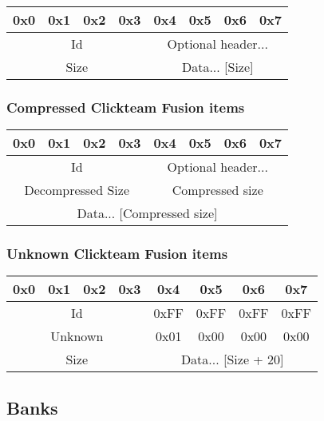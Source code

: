 \documentclass{article}
\begin{document}
\begin{tabular}{c|c|c|c|c|c|c|c}
  0x0 & 0x1 & 0x2 & 0x3 & 0x4 & 0x5 & 0x6 & 0x7
  \\ \hline
  \multicolumn{4}{|c|}{Id} &
  \multicolumn{4}{|c}{Optional header...}
  \\ \hline \hline
  \multicolumn{4}{|c|}{Size} &
  \multicolumn{4}{|c}{Data... [Size]}
  \\ \hline
\end{tabular}

\subsubsection[Compressed CTF items]{Compressed Clickteam Fusion items}

\begin{tabular}{c|c|c|c|c|c|c|c}
  0x0 & 0x1 & 0x2 & 0x3 & 0x4 & 0x5 & 0x6 & 0x7
  \\ \hline
  \multicolumn{4}{|c|}{Id} &
  \multicolumn{4}{|c}{Optional header...}
  \\ \hline \hline
  \multicolumn{4}{|c|}{Decompressed Size} &
  \multicolumn{4}{|c|}{Compressed size}
  \\ \hline
  \multicolumn{8}{|c}{Data... [Compressed size]}
  \\ \hline
\end{tabular}

\subsubsection[Unknown CTF items]{Unknown Clickteam Fusion items}

\begin{tabular}{c|c|c|c|c|c|c|c}
  0x0 & 0x1 & 0x2 & 0x3 & 0x4 & 0x5 & 0x6 & 0x7
  \\ \hline
  \multicolumn{4}{|c|}{Id} &
  \multicolumn{1}{|c|}{0xFF} &
  \multicolumn{1}{|c|}{0xFF} &
  \multicolumn{1}{|c|}{0xFF} &
  \multicolumn{1}{|c|}{0xFF}
  \\ \hline
  \multicolumn{4}{|c|}{Unknown} &
  \multicolumn{1}{|c|}{0x01} &
  \multicolumn{1}{|c|}{0x00} &
  \multicolumn{1}{|c|}{0x00} &
  \multicolumn{1}{|c|}{0x00}
  \\ \hline \hline
  \multicolumn{4}{|c|}{Size} &
  \multicolumn{4}{|c}{Data... [Size + 20]}
  \\ \hline
\end{tabular}


\subsection{Banks}
\label{subsec:banks}
\end{document}
